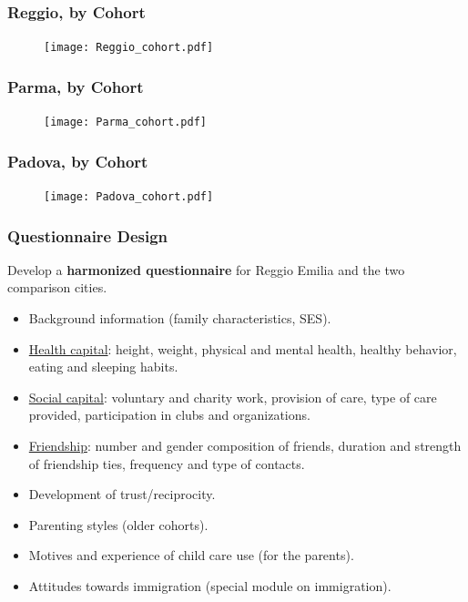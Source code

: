 \documentclass[xcolor=table]{beamer}
\begin{document}
\begin{frame}
\begin{tiny}

\end{tiny}
\end{frame}
\begin{frame}
\frametitle{Reggio, by Cohort}
\begin{center}
\begin{figure}
\texttt{[image: Reggio\_cohort.pdf]}
\end{figure}
\end{center}
\end{frame}
\begin{frame}
\frametitle{Parma, by Cohort}
\begin{center}
\begin{figure}
\texttt{[image: Parma\_cohort.pdf]}
\end{figure}
\end{center}
\end{frame}
\begin{frame}
\frametitle{Padova, by Cohort}
\begin{center}
\begin{figure}
\texttt{[image: Padova\_cohort.pdf]}
\end{figure}
\end{center}
\end{frame}
\begin{frame}
\frametitle{Questionnaire Design}
Develop a \textbf{harmonized questionnaire} for Reggio Emilia and the two comparison cities.
\begin{itemize}
\item Background information (family characteristics, SES).
\item \underline{Health capital}: height, weight, physical and mental health, healthy behavior, eating and sleeping habits.
\item \underline{Social capital}: voluntary and charity work, provision of care, type of care provided, participation in clubs and organizations.
\item \underline{Friendship}: number and gender composition of friends, duration and strength of friendship ties, frequency and type of contacts.
\item Development of trust/reciprocity.
\item Parenting styles (older cohorts).
\item Motives and experience of child care use (for the parents).
\item Attitudes towards immigration (special module on immigration).
\end{itemize}
\end{frame} 
\end{document}

